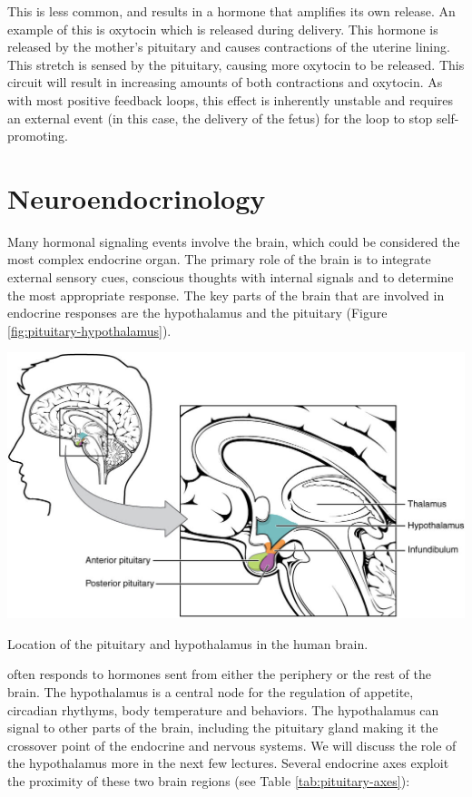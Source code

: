\documentclass{tufte-handout}
\begin{document}
  This is less common, and results in a hormone that amplifies its own release.  An example of this is oxytocin which is released during delivery.  This hormone is released by the mother's pituitary and causes contractions of the uterine lining.  This stretch is sensed by the pituitary, causing more oxytocin to be released.  This circuit will result in increasing amounts of both contractions and oxytocin.  As with most positive feedback loops, this effect is inherently unstable and requires an external event (in this case, the delivery of the fetus) for the loop to stop self-promoting.

\section{Neuroendocrinology}

Many hormonal signaling events involve the brain, which could be considered the most complex endocrine organ.  The primary role of the brain is to integrate external sensory cues, conscious thoughts with internal signals and to determine the most appropriate response.  The key parts of the brain that are involved in endocrine responses are the hypothalamus and the pituitary (Figure \ref{fig:pituitary-hypothalamus}).

\begin{marginfigure}
  \includegraphics{figures/pituitary-hypothalamus}
  \caption{Location of the pituitary and hypothalamus in the human brain.}
    \label{fig:pituitary-hypothalamus}
\end{marginfigure}

 often responds to hormones sent from either the periphery or the rest of the brain.  The hypothalamus is a central node for the regulation of appetite, circadian rhythyms, body temperature and behaviors.  The hypothalamus can signal to other parts of the brain, including the pituitary gland making it the crossover point of the endocrine and nervous systems.  We will discuss the role of the hypothalamus more in the next few lectures.  Several endocrine axes exploit the proximity of these two brain regions (see Table \ref{tab:pituitary-axes}):
\end{document}
